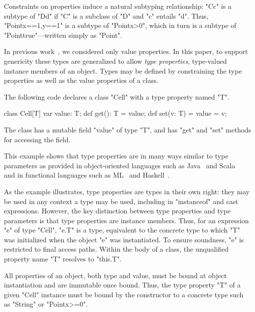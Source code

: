 \documentclass[preprint,nocopyrightspace,9pt]{sigplanconf}
\begin{document}

Constraints on properties induce a natural subtyping relationship:
\xcd"C{c}" is a subtype of
\xcd"D{d}" if \xcd"C" is a subclass of \xcd"D" and
\xcd"c" entails \xcd"d".  Thus, \xcd"Point{x==1,y==1}"
is a subtype of \xcd"Point{x>0}", which in turn is a subtype of
\xcd"Point{true}"---written simply as \xcd"Point".

In previous
work~\cite{X10,constrained-types}, we considered
only value properties.
In this paper,
to support genericity these types are generalized
to allow \emph{type properties}, type-valued instance
members of an object.
Types may be defined by constraining the type properties as
well as the value properties of a class.

The following code declares a class \xcd"Cell" with a type
property named \xcd"T".
\begin{xten}
class Cell[T] {
    var value: T;
    def get(): T = value;
    def set(v: T) = { value = v; }
}
\end{xten}
The class has a mutable field \xcd"value" of type \xcd"T",
and has \xcd"get" and \xcd"set" methods for accessing the field.

This example shows that type properties are in many ways similar to
type parameters as provided in object-oriented languages such as
Java~\cite{Java3} and Scala~\cite{scala} and in functional
languages such as ML~\cite{ml} and
Haskell~\cite{haskell}.

As the example illustrates,
type properties are types in their own right:
they may be used in any context a type may be used,
including in \xcd"instanceof" and cast expressions.
%
However, the key distinction between type properties
and type parameters is that type properties are instance
members.
Thus, for an expression \xcd"e" of type \xcd"Cell", \xcd"e.T" is
a type, equivalent to the concrete type to which \xcd"T" was
initialized when the object \xcd"e" was instantiated.
To ensure
soundness, \xcd"e" is restricted to final access paths.
Within the body of a class, the unqualified property name \xcd"T" resolves
to \xcd"this.T".

All properties of an object, both type and value, must be bound at object
instantiation and are immutable once bound.  Thus, the type
property \xcd"T" of a given \xcd"Cell" instance must be bound
by the constructor
to a concrete type such as \xcd"String" or \xcd"Point{x>=0}".
\end{document}
